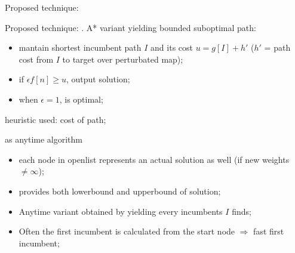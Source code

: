 \begin{frame}{Proposed technique: \CPDSearch{}}
{\begin{minipage}{0.35\textwidth}
\begin{center}
            \end{center}
        \end{minipage}
    }
\end{frame}


\begin{frame}{Proposed technique: \CPDSearch{}}
    \textbf{\CPDSearch{}}. A* variant yielding bounded suboptimal path:
    \begin{itemize}
        \item mantain shortest incumbent path $I$ and its cost $u = g[I] + h'$ ($h'$ = \CPD{} path cost from $I$ to target over perturbated map);
        \item if $\epsilon f[n] \geq u$, output solution;
        \item when $\epsilon = 1$, \CPDSearch{} is optimal;
    \end{itemize}

    heuristic used: cost of \CPD{} path;
    
\end{frame}

\begin{frame}{\CPDSearch{} as anytime algorithm}
    \begin{itemize}
        \item each node in openlist represents an actual solution as well (if new weights $\not = \infty$); 
        \item \CPD{} provides both lowerbound and upperbound of solution;
        \item Anytime variant obtained by yielding every incumbents $I$ \CPDSearch{} finds;
        \item Often the first incumbent is calculated from the start node $\Rightarrow$ fast first incumbent;
    \end{itemize}
\end{frame}